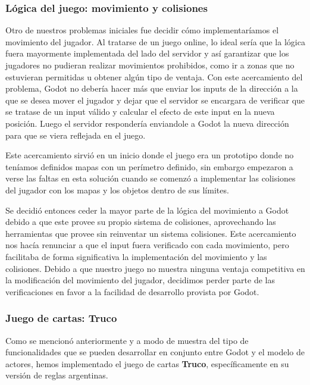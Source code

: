 \subsubsection{Lógica del juego: movimiento y colisiones}
\noindent Otro de nuestros problemas iniciales fue decidir cómo implementaríamos el movimiento del 
jugador. Al tratarse de un juego online, lo ideal sería que la lógica fuera mayormente implementada del 
lado del servidor y así garantizar que los jugadores no pudieran realizar movimientos prohibidos, como 
ir a zonas que no estuvieran permitidas u obtener algún tipo de ventaja. Con este acercamiento del 
problema, Godot no debería hacer más que enviar los inputs de la dirección a la que se desea mover el 
jugador y dejar que el servidor se encargara de verificar que se tratase de un input válido y calcular 
el efecto de este input en la nueva posición. Luego el servidor respondería enviandole a Godot la nueva
dirección para que se viera reflejada en el juego.

Este acercamiento sirvió en un inicio donde el juego era un prototipo donde no teníamos definidos 
mapas con un perímetro definido, sin embargo empezaron a verse las faltas en esta solución cuando 
se comenzó a implementar las colisiones del jugador con los mapas y los objetos dentro de sus límites.

Se decidió entonces ceder la mayor parte de la lógica del movimiento a Godot debido a que este provee 
su propio sistema de colisiones, aprovechando las herramientas que provee sin reinventar un sistema 
colisiones. Este acercamiento nos hacía renunciar a que el input fuera 
verificado con cada movimiento, pero facilitaba de forma significativa la implementación del 
movimiento y las colisiones. Debido a que nuestro juego no muestra ninguna ventaja competitiva 
en la modificación del movimiento del jugador, decidimos perder parte de las verificaciones en 
favor a la facilidad de desarrollo provista por Godot.


\subsubsection{Juego de cartas: Truco}
\noindent Como se mencionó anteriormente y a modo de muestra del tipo de funcionalidades que se pueden
desarrollar en conjunto entre Godot y el modelo de actores, hemos implementado el juego de cartas \textbf{Truco},
específicamente en su versión de reglas argentinas.

